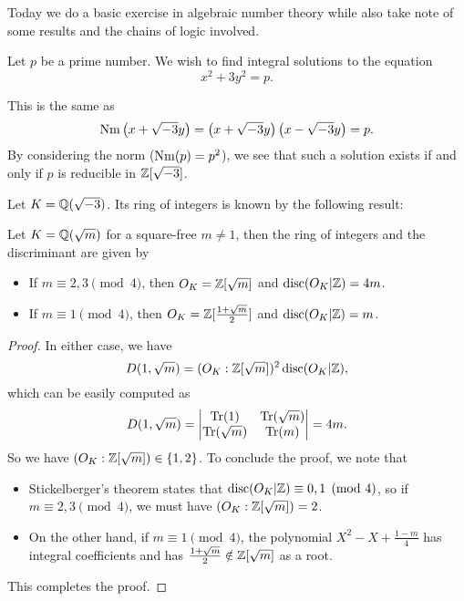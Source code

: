 \documentclass{article}
\newcommand{\m}{\sqrt{-3}}
\begin{document}
\self

Today we do a basic exercise in algebraic number theory while also take note of some results and the chains of logic involved.

Let $p$ be a prime number. We wish to find integral solutions to the equation
\begin{equation}\label{eq:origin}
    x^2+3y^2=p.
\end{equation}

This is the same as
\begin{equation*}
    \Nm\bp{x+\m y}=\bp{x+\m y}\bp{x-\m y}=p.
\end{equation*}
By considering the norm ($\operatorname{Nm}(p)=p^2$), we see that such a solution exists if and only if $p$ is reducible in $\Z[\m]$.

Let $K=\Q(\m)$. Its ring of integers is known by the following result:
\begin{proposition}\label{prop:ok}
    Let $K=\mathbb{Q}(\sqrt{m})$ for a square-free $m\neq 1$, then the ring of integers and the discriminant are given by
    \begin{itemize}
        \item If $m\equiv 2,3\pmod{4}$, then $O_K=\mathbb{Z}[\sqrt{m}]$ and $\operatorname{disc}(O_K\vert\mathbb{Z})=4m$.
        \item If $m\equiv 1\pmod{4}$, then $O_K=\mathbb{Z}[\frac{1+\sqrt{m}}{2}]$ and $\operatorname{disc}(O_K\vert\mathbb{Z})=m$.
    \end{itemize}
\end{proposition}

\begin{proof}
    In either case, we have
    \[
        D(1,\sqrt{m})=(O_K:\mathbb{Z}[\sqrt{m}])^2\operatorname{disc}(O_K\vert \mathbb{Z}),
    \]
    which can be easily computed as
    \[
        D(1,\sqrt{m})=
        \begin{vmatrix}
            \operatorname{Tr}(1) & \operatorname{Tr}(\sqrt{m}) \\
            \operatorname{Tr}(\sqrt{m}) & \operatorname{Tr}(m) \\
        \end{vmatrix}
        =4m.
    \]
    So we have $(O_K:\mathbb{Z}[\sqrt{m}])\in\left\{1,2\right\}$. To conclude the proof, we note that
    \begin{itemize}
        \item Stickelberger's theorem states that $\operatorname{disc}(O_K\vert \mathbb{Z})\equiv 0,1\pmod{4}$, so if $m\equiv 2,3\pmod{4}$, we must have $(O_K:\mathbb{Z}[\sqrt{m}])=2$.
        \item On the other hand, if $m\equiv 1\pmod{4}$, the polynomial $X^2-X+\frac{1-m}{4}$ has integral coefficients and has $\frac{1+\sqrt{m}}{2}\notin\mathbb{Z}[\sqrt{m}]$ as a root.
    \end{itemize}
    This completes the proof.
\end{proof}
\end{document}
